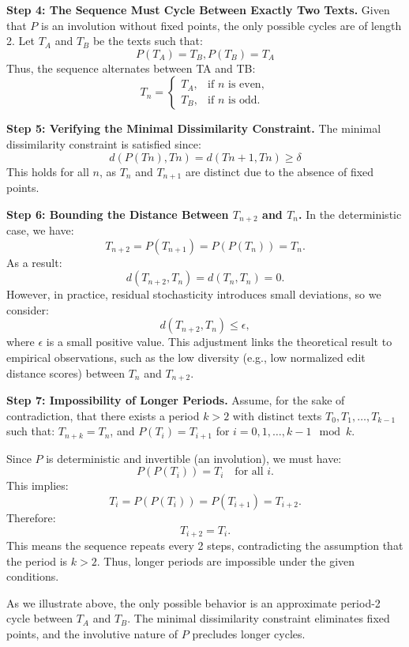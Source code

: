 \textbf{Step 4: The Sequence Must Cycle Between Exactly Two Texts.}
Given that \(P\) is an involution without fixed points, the only possible cycles
are of length 2. Let \(T_A\) and \(T_B\) be the texts such that:
\[
P(T_A)=T_B, P(T_B)=T_A
\]
Thus, the sequence alternates between TA and TB:
\begin{equation*}
T_n =
\begin{cases}
    T_A, & \text{if } n \text{ is even}, \\
    T_B, & \text{if } n \text{ is odd}.
\end{cases}
\end{equation*}


\textbf{Step 5: Verifying the Minimal Dissimilarity Constraint.}
The minimal dissimilarity constraint is satisfied since:
\[d(P(Tn), Tn) = d(Tn+1, Tn) \geq \delta\]
This holds for all \(n\), as \(T_n\) and \(T_{n+1}\) are distinct due to the absence of fixed points.

\textbf{Step 6: Bounding the Distance Between \(T_{n+2}\) and \(T_n\).}
In the deterministic case, we have:
\[
T_{n+2} = P(T_{n+1}) = P(P(T_n)) = T_n.
\]
As a result:
\[
d(T_{n+2}, T_n) = d(T_n, T_n) = 0.
\]
However, in practice, residual stochasticity introduces small deviations, so we consider:
\[
d(T_{n+2}, T_n) \leq \epsilon,
\]
where \(\epsilon\) is a small positive value. This adjustment links the theoretical result to empirical observations, such as the low diversity (e.g., low normalized edit distance scores) between \(T_n\) and \(T_{n+2}\).

\textbf{Step 7: Impossibility of Longer Periods.}
Assume, for the sake of contradiction, that there exists a period \(k > 2\) with distinct texts \(T_0, T_1, \dots, T_{k-1}\) such that: \(T_{n+k} = T_n\), and \(P(T_i) = T_{i+1}\) for \(i = 0, 1, \dots, k-1 \mod k\).

Since \(P\) is deterministic and invertible (an involution), we must have:
\[
P(P(T_i)) = T_i \quad \text{for all } i.
\]
This implies:
\[
T_i = P(P(T_i)) = P(T_{i+1}) = T_{i+2}.
\]
Therefore:
\[
T_{i+2} = T_i.
\]
This means the sequence repeats every 2 steps, contradicting the assumption that the period is \(k > 2\). Thus, longer periods are impossible under the given conditions.


As we illustrate above, the only possible behavior is an approximate period-2 cycle between \(T_A\) and \(T_B\). The minimal dissimilarity constraint eliminates
fixed points, and the involutive nature of \(P\) precludes longer cycles. 
\fi
